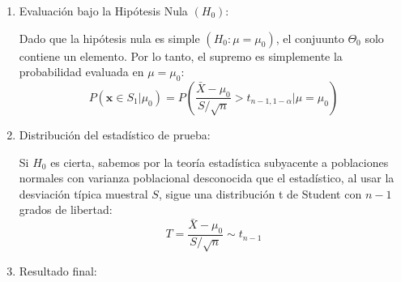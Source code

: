 \begin{enumerate}[label=\color{red}\textbf{\arabic*)}]
\begin{enumerate}[label=\arabic*)]
		            La extensión de un test $\delta$ se define como el supremo de la probabilidad de error tipo I en la región nula: \[
			            \text{extensión}=\sup_{\theta\in \Theta_0}P_{I,\delta}(\theta)=\sup_{\mu=\mu_0}P(\mathbf{x}\in S_1|\mu)
		            \]
		      \item Evaluación bajo la Hipótesis Nula $(H_0)$:

		            Dado que la hipótesis nula es simple $(H_0:\mu=\mu_0)$, el conjuunto $\Theta_0$ solo contiene un elemento. Por lo tanto, el supremo es simplemente la probabilidad evaluada en $\mu=\mu_0$: \[
			            P(\mathbf{x}\in S_1|\mu_0)=P \left( \dfrac{\bar{X}-\mu_0}{S / \sqrt{n} }>t_{n-1,1-\alpha}\bigg| \mu=\mu_0 \right)
		            \]
		      \item Distribución del estadístico de prueba:

		            Si $H_0$ es cierta, sabemos por la teoría estadística subyacente a poblaciones normales con varianza poblacional desconocida que el estadístico, al usar la desviación típica muestral $S$, sigue una distribución t de Student con $n-1$ grados de libertad:
		            \[
			            T=\dfrac{\bar{X}-\mu_0}{S / \sqrt{n} }\sim t_{n-1}
		            \]
		      \item Resultado final:


\end{enumerate}
\end{enumerate}
